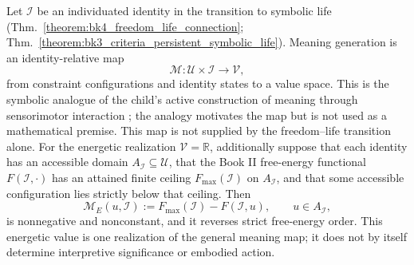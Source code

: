 \begin{corollary} \label{corollary:bk4_emergence_of_meaning}
\par
Let $\mathcal I$ be an individuated identity in the transition to symbolic life
(Thm.~\ref{theorem:bk4_freedom_life_connection};
Thm.~\ref{theorem:bk3_criteria_persistent_symbolic_life}).  Meaning generation
is an identity-relative map
\begin{equation}
    \mathcal{M}: \mathcal{U} \times \mathcal{I} \to \mathcal{V},
\end{equation}
from constraint configurations and identity states to a value space.  This is the
symbolic analogue of the child's active construction of meaning through
sensorimotor interaction \citep{piaget1954construction}; the analogy motivates
the map but is not used as a mathematical premise.  This map
is not supplied by the freedom--life transition alone.  For the energetic
realization $\mathcal V=\mathbb R$, additionally suppose that each identity has
an accessible domain $A_{\mathcal I}\subseteq\mathcal U$, that the Book II
free-energy functional $F(\mathcal I,\cdot)$ has an attained finite ceiling
$F_{\max}(\mathcal I)$ on $A_{\mathcal I}$, and that some accessible
configuration lies strictly below that ceiling.  Then
\begin{equation}
 \mathcal M_E(u,\mathcal I)
 :=F_{\max}(\mathcal I)-F(\mathcal I,u),\qquad u\in A_{\mathcal I},
\end{equation}
is nonnegative and nonconstant, and it reverses strict free-energy order.
This energetic value is one realization of the general meaning map; it does
not by itself determine interpretive significance or embodied action.
\end{corollary}
